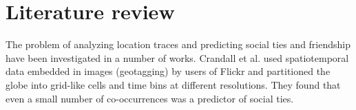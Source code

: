 \section{Literature review}
The problem of analyzing location traces and predicting social ties and friendship have been investigated in a number of works. Crandall et al.\cite{ISTfGC} used spatiotemporal data embedded in images (geotagging) by users of Flickr and partitioned the globe into grid-like cells and time bins at different resolutions. They found that even a small number of co-occurrences was a predictor of social ties.